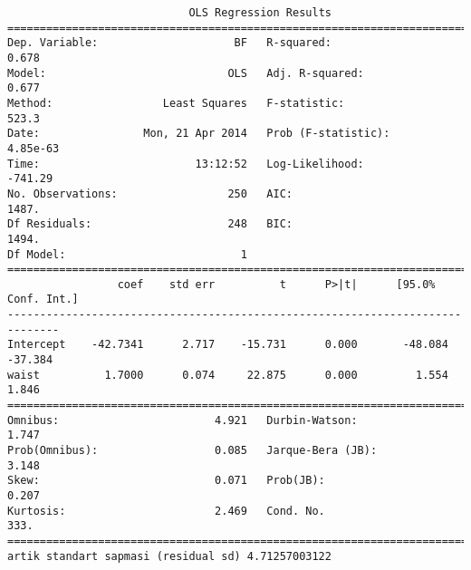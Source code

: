 \documentclass[12pt,fleqn]{article}\usepackage{../common}
\begin{document}
\begin{verbatim}
                            OLS Regression Results                            
==============================================================================
Dep. Variable:                     BF   R-squared:                       0.678
Model:                            OLS   Adj. R-squared:                  0.677
Method:                 Least Squares   F-statistic:                     523.3
Date:                Mon, 21 Apr 2014   Prob (F-statistic):           4.85e-63
Time:                        13:12:52   Log-Likelihood:                -741.29
No. Observations:                 250   AIC:                             1487.
Df Residuals:                     248   BIC:                             1494.
Df Model:                           1                                         
==============================================================================
                 coef    std err          t      P>|t|      [95.0% Conf. Int.]
------------------------------------------------------------------------------
Intercept    -42.7341      2.717    -15.731      0.000       -48.084   -37.384
waist          1.7000      0.074     22.875      0.000         1.554     1.846
==============================================================================
Omnibus:                        4.921   Durbin-Watson:                   1.747
Prob(Omnibus):                  0.085   Jarque-Bera (JB):                3.148
Skew:                           0.071   Prob(JB):                        0.207
Kurtosis:                       2.469   Cond. No.                         333.
==============================================================================
artik standart sapmasi (residual sd) 4.71257003122
\end{verbatim}
\end{document}
